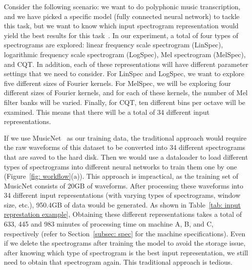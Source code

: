 \documentclass{ieeeaccess}
\begin{document}
Consider the following scenario: we want to do polyphonic music transcription, and we have picked a specific model (fully connected neural network) to tackle this task, but we want to know which input spectrogram representation would yield the best results for this task~\cite{Cheuk2020TheIO}. In our experiment, a total of four types of spectrograms are explored: linear frequency scale spectrogram (LinSpec), logarithmic frequency scale spectrogram (LogSpec), Mel spectrogram (MelSpec), and CQT. In addition, each of these representations will have different parameter settings that we need to consider. For LinSpec and LogSpec, we want to explore five different sizes of Fourier kernels. For MelSpec, we will be exploring four different sizes of Fourier kernels, and for each of these kernels, the number of Mel filter banks will be varied. Finally, for CQT, ten different bins per octave will be examined. This means that there will be a total of 34 different input representations.

If we use MusicNet~\cite{thickstun2017learning, thickstun2018invariances} as our training data, the traditional approach would require the raw waveforms of this dataset to be converted into 34 different spectrograms that are saved to the hard disk. Then we would use a dataloader to load different types of spectrograms into different neural networks to train them one by one (Figure~\ref{fig: workflow}(a)). This approach is impractical, as the training set of MusicNet consists of 20GB of waveforms. After processing these waveforms into 34 different input representations (with varying types of spectrograms, window size, etc.), 950.4GB of data would be generated. {As shown in Table~\ref{tab: input represtation example}, Obtaining these different representations takes a total of 633, 445 and 983 minutes of processing time on machine A, B, and C, respectively (refer to Section~\ref{subsec: spec} for the machine specifications).} Even if we delete the spectrograms after training the model to avoid the storage issue, after knowing which type of spectrogram is the best input representation, we still need to obtain that spectrogram again. This traditional approach is tedious.
\end{document}

